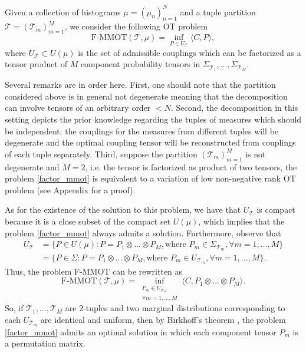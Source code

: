 \begin{definition}
  Given a collection of histograms $\mu = (\mu_n)_{n=1}^N$ and a tuple partition $\mathcal T = (\mathcal T_m)_{m=1}^M$,
  we consider the following OT problem
  \begin{equation} \label{factor_mmot}
    \text{F-MMOT}( \mathcal T, \mu) = \inf_{P \in U_{\mathcal T}} \langle C, P \rangle,
  \end{equation}
  where $U_{\mathcal T} \subset U(\mu)$ is the set of admissible couplings which can be factorized as a tensor product of $M$
  component probability tensors in $\Sigma_{\mathcal T_1}, ..., \Sigma_{\mathcal T_M}$.
\end{definition}
Several remarks are in order here. First, one should note that the partition considered above is in general not degenerate meaning
that the decomposition can involve tensors of an arbitrary order $<N$. Second, the decomposition in this setting depicts the prior
knowledge regarding the tuples of measures which should be independent: the couplings for the measures from different tuples will
be degenerate and the optimal coupling tensor will be reconstructed from couplings of each tuple separately.
Third, suppose the partition $(\mathcal T_m)_{m=1}^M$ is not degenerate and $M=2$, i.e. the tensor is factorized as product of
two tensors, the problem \cref{factor_mmot} is equivalent to a variation of low non-negative rank OT problem (see Appendix for a proof).

As for the existence of the solution to this problem, we have that $U_{\mathcal T}$ is compact because it is a close subset of the
compact set $U(\mu)$, which implies that the problem \cref{factor_mmot} always admits a solution. Furthermore, observe that
\begin{equation*}
  \begin{split}
    U_{\mathcal T} &= \{ P \in U(\mu): P = P_1 \otimes ... \otimes P_M, \text{where } P_m \in \Sigma_{\mathcal T_m}, \forall m = 1,...,M \} \\
    &= \{ P \in \Sigma: P = P_1 \otimes ... \otimes P_M, \text{where } P_m \in U_{\mathcal T_m}, \forall m = 1,...,M \}.
  \end{split}
\end{equation*}
Thus, the problem F-MMOT can be rewritten as
\begin{equation*}
  \text{F-MMOT}( \mathcal T, \mu) = \inf_{\substack{P_m \in U_{\mathcal T_m} \\ \forall m = 1,...,M}}
  \langle C, P_1 \otimes ... \otimes P_M \rangle.
\end{equation*}
So, if $\mathcal T_1,...,\mathcal T_M$ are $2$-tuples and two marginal distributions corresponding to each $U_{\mathcal T_m}$ are
identical and uniform, then by Birkhoff's theorem \citep{Birkhoff46}, the problem \ref{factor_mmot} admits an optimal solution in
which each component tensor $P_m$ is a permutation matrix.

